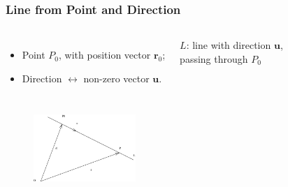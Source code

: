 \begin{frame}
 \frametitle{Line from Point and Direction}
\begin{columns}
  \column{6cm}
\begin{itemize}
 \item Point $P_0$, with position vector $\textbf{r}_0$;
\item Direction $\leftrightarrow$ non-zero vector $\textbf{u}$.
\end{itemize}
  \column{5cm}
 $L$: line with direction $\textbf{u}$, \\passing through $P_0$
\end{columns}

\bigskip

\begin{columns}
  \column{6cm}
  \column{6cm}
    \begin{figure}
        \includegraphics[height=1in]{../../modules/vectors/pictures/ok-line_point_direction_vector.eps}
    \end{figure}
\end{columns}



\end{frame}

